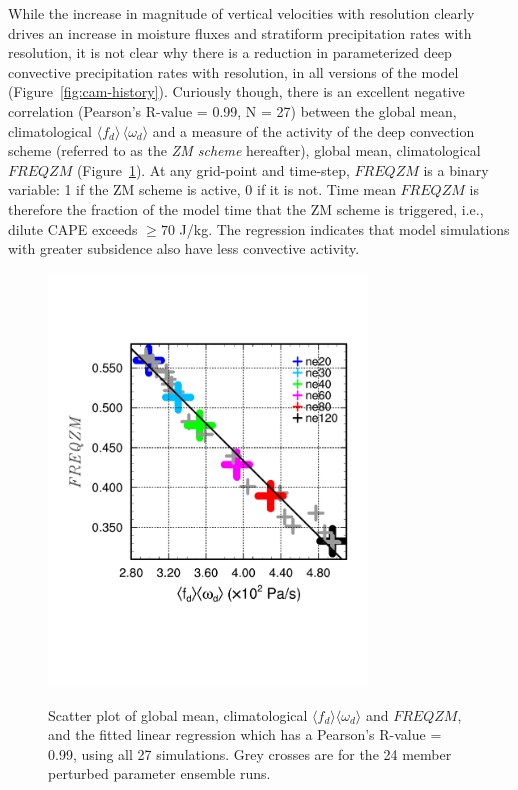 \documentclass[times]{qjrms4}
\begin{document}
While the increase in magnitude of vertical velocities with resolution clearly drives an increase in moisture fluxes and stratiform precipitation rates with resolution, it is not clear why there is a reduction in parameterized deep convective precipitation rates with resolution, in all versions of the model (Figure~\ref{fig:cam-history}). Curiously though, there is an excellent negative correlation (Pearson's R-value = 0.99, N = 27) between the global mean, climatological $\langle f_{d} \rangle \, \langle \omega_{d} \rangle$ and a measure of the activity of the \cite{ZM1995AO} deep convection scheme (referred to as the {\em{ZM scheme}} hereafter), global mean, climatological $FREQZM$ (Figure~\ref{fig:corr}). At any grid-point and time-step, $FREQZM$ is a binary variable: 1 if the ZM scheme is active, 0 if it is not. Time mean $FREQZM$ is therefore the fraction of the model time that the ZM scheme is triggered, i.e., dilute CAPE exceeds $\geq 70$ J/kg. The regression indicates that model simulations with greater subsidence also have less convective activity.

\begin{figure}
\begin{center}
\noindent\includegraphics[width=20pc,angle=0]{figs/temp_diags_corr.pdf}\\
\end{center}
\caption{Scatter plot of global mean, climatological $\langle f_{d} \rangle \langle \omega_{d} \rangle$ and $FREQZM$, and the fitted linear regression which has a Pearson's R-value = 0.99, using all 27 simulations. Grey crosses are for the 24 member perturbed parameter ensemble runs.}
\label{fig:corr}
\end{figure}
\end{document}

